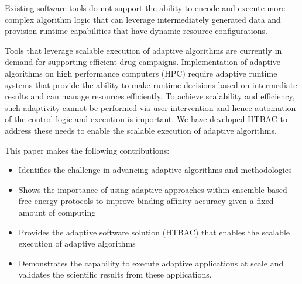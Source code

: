  

Existing software tools do not support the ability to encode and execute more 
complex algorithm logic that can leverage intermediately generated data and 
provision runtime capabilities that have dynamic resource configurations. 

Tools that leverage scalable execution of adaptive algorithms are currently 
in demand for supporting efficient drug campaigns. Implementation of adaptive 
algorithms on high performance computers (HPC) require adaptive 
runtime systems that provide the ability to make runtime decisions based on 
intermediate results and can manage resources efficiently. To achieve 
scalability and efficiency, such adaptivity cannot be performed via user 
intervention and hence automation of the control logic and execution is 
important. We have developed HTBAC to address these needs to enable the scalable 
execution of adaptive algorithms. 



This paper makes the following contributions:
\begin{itemize}
  \item Identifies the challenge in advancing adaptive algorithms and 
  methodologies
  \item Shows the importance of using adaptive approaches within ensemble-based
  free energy protocols to improve binding affinity accuracy given a fixed 
  amount of computing
  \item Provides the adaptive software solution (HTBAC) that enables the 
  scalable execution of adaptive algorithms
  \item Demonstrates the capability to execute adaptive applications at scale 
  and validates the scientific results from these applications.
\end{itemize}

